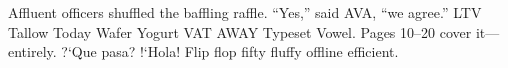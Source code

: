 \documentclass{article}
\begin{document}
Affluent officers shuffled the baffling raffle. ``Yes,'' said AVA, ``we
agree.'' LTV Tallow Today Wafer Yogurt VAT AWAY Typeset Vowel. Pages 10--20
cover it---entirely. ?`Que pasa? !`Hola! Flip flop fifty fluffy offline
efficient.
\end{document}
